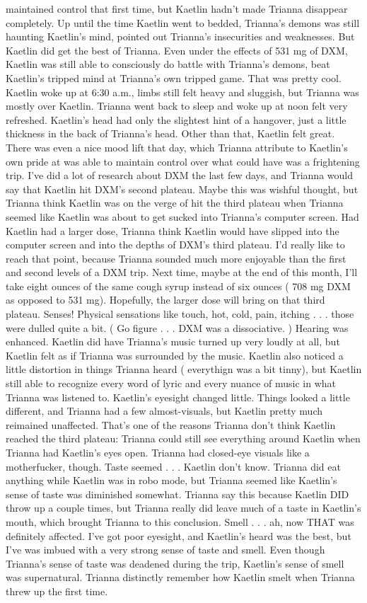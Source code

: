 \documentclass[12pt]{book}
\begin{document}
maintained control that first time, but Kaetlin hadn't made Trianna disappear completely. Up until the time Kaetlin went to bedded, Trianna's demons was still haunting Kaetlin's mind, pointed out Trianna's insecurities and weaknesses. But Kaetlin did get the best of Trianna. Even under the effects of 531 mg of DXM, Kaetlin was still able to consciously do battle with Trianna's demons, beat Kaetlin's tripped mind at Trianna's own tripped game. That was pretty cool. Kaetlin woke up at 6:30 a.m., limbs still felt heavy and sluggish, but Trianna was mostly over Kaetlin. Trianna went back to sleep and woke up at noon felt very refreshed. Kaetlin's head had only the slightest hint of a hangover, just a little thickness in the back of Trianna's head. Other than that, Kaetlin felt great. There was even a nice mood lift that day, which Trianna attribute to Kaetlin's own pride at was able to maintain control over what could have was a frightening trip. I've did a lot of research about DXM the last few days, and Trianna would say that Kaetlin hit DXM's second plateau. Maybe this was wishful thought, but Trianna think Kaetlin was on the verge of hit the third plateau when Trianna seemed like Kaetlin was about to get sucked into Trianna's computer screen. Had Kaetlin had a larger dose, Trianna think Kaetlin would have slipped into the computer screen and into the depths of DXM's third plateau. I'd really like to reach that point, because Trianna sounded much more enjoyable than the first and second levels of a DXM trip. Next time, maybe at the end of this month, I'll take eight ounces of the same cough syrup instead of six ounces ( 708 mg DXM as opposed to 531 mg). Hopefully, the larger dose will bring on that third plateau. Senses! Physical sensations like touch, hot, cold, pain, itching . . .  those were dulled quite a bit. ( Go figure . . .  DXM was a dissociative. ) Hearing was enhanced. Kaetlin did have Trianna's music turned up very loudly at all, but Kaetlin felt as if Trianna was surrounded by the music. Kaetlin also noticed a little distortion in things Trianna heard ( everythign was a bit tinny), but Kaetlin still able to recognize every word of lyric and every nuance of music in what Trianna was listened to. Kaetlin's eyesight changed little. Things looked a little different, and Trianna had a few almost-visuals, but Kaetlin pretty much reimained unaffected. That's one of the reasons Trianna don't think Kaetlin reached the third plateau: Trianna could still see everything around Kaetlin when Trianna had Kaetlin's eyes open. Trianna had closed-eye visuals like a motherfucker, though. Taste seemed . . .  Kaetlin don't know. Trianna did eat anything while Kaetlin was in robo mode, but Trianna seemed like Kaetlin's sense of taste was diminished somewhat. Trianna say this because Kaetlin DID throw up a couple times, but Trianna really did leave much of a taste in Kaetlin's mouth, which brought Trianna to this conclusion. Smell . . .  ah, now THAT was definitely affected. I've got poor eyesight, and Kaetlin's heard was the best, but I've was imbued with a very strong sense of taste and smell. Even though Trianna's sense of taste was deadened during the trip, Kaetlin's sense of smell was supernatural. Trianna distinctly remember how Kaetlin smelt when Trianna threw up the first time. 
\end{document}

